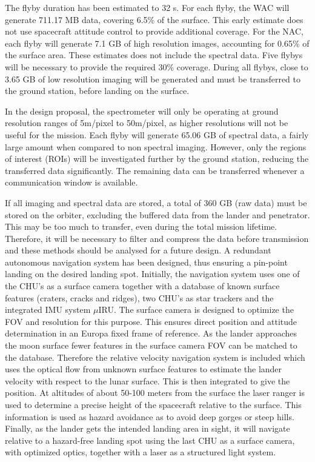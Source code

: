 The flyby duration has been estimated to 32 s. For each flyby, the WAC will generate 711.17 MB data, covering 6.5\% of the surface. This early estimate does not use spacecraft attitude control to provide additional coverage. For the NAC, each flyby will generate 7.1 GB of high resolution images, accounting for 0.65\% of the surface area. These estimates does not include the spectral data. Five flybys will be necessary to provide the required 30\% coverage. During all flybys, close to 3.65 GB of low resolution imaging will be generated and must be transferred to the ground station, before landing on the surface.

In the design proposal, the spectrometer will only be operating at ground resolution ranges of 5m/pixel to 50m/pixel, as higher resolutions will not be useful for the mission. Each flyby will generate 65.06 GB of spectral data, a fairly large amount when compared to non spectral imaging. However, only the regions of interest (ROIs) will be investigated further by the ground station, reducing the transferred data significantly. The remaining data can be transferred whenever a communication window is available. 

If all imaging and spectral data are stored, a total of 360 GB (raw data) must be stored on the orbiter,  excluding the buffered data from the lander and penetrator. This may be too much to transfer, even during the total mission lifetime. Therefore, it will be necessary to filter and compress the data before transmission and these methods should be analysed for a future design.
A redundant autonomous navigation system has been designed, thus ensuring a pin-point landing on the desired landing spot. Initially, the navigation system uses one of the CHU's as a surface camera together with a database of known surface features (craters, cracks and ridges), two CHU's as star trackers and the integrated IMU system $\mu$IRU. The surface camera is designed to optimize the FOV and resolution for this purpose. This ensures direct position and attitude determination in an Europa fixed frame of reference.
As the lander approaches the moon surface fewer features in the surface camera FOV can be matched to the database. Therefore the relative velocity navigation system is included which uses the optical flow from unknown surface features to estimate the lander velocity with respect to the lunar surface. This is then integrated to give the position. At altitudes of about 50-100 meters from the surface the laser ranger is used to determine a precise height of the spacecraft relative to the surface. This information is used as hazard avoidance as to avoid deep gorges or steep hills. Finally, as the lander gets the intended landing area in sight, it will navigate relative to a hazard-free landing spot using the last CHU as a surface camera, with optimized optics, together with a laser as a structured light system. 

